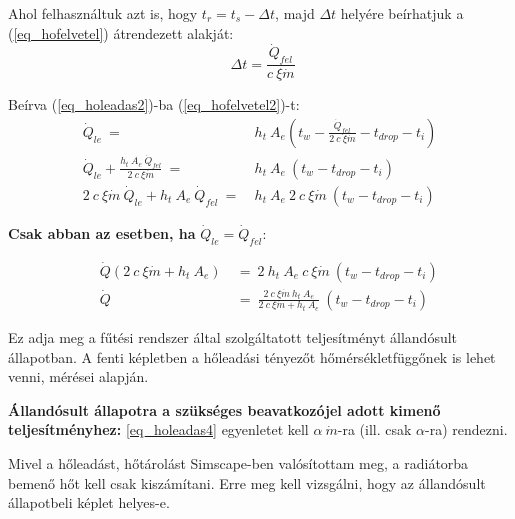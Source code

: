 Ahol felhasználtuk azt is, hogy $t_r = t_s-\Delta t$, majd $\Delta t$ helyére beírhatjuk a (\ref{eq_hofelvetel})  átrendezett alakját:
\begin{equation} \label{eq_hofelvetel2}
~~\Delta t = \frac{\dot Q_{fel}}{c ~ \xi\dot{m}}
\end{equation}

Beírva (\ref{eq_holeadas2})-ba (\ref{eq_hofelvetel2})-t:
\begin{equation} \label{holeadas3}
\begin{aligned}
\dot Q_{le} ~=~ & h_t~ A_e\left( t_w-\frac{\dot Q_{fel}}{2~c ~ \xi\dot{m}}-t_{drop}-t_i\right)  \\[18pt]
\dot Q_{le} + \frac{h_t ~ A_e ~ \dot Q_{fel}}{2 ~ c ~ \xi\dot{m}} ~ = ~ & h_t ~ A_e ~\left( t_w-t_{drop}-t_i\right) \\[24pt]
2 ~ c ~ \xi\dot{m} ~ \dot Q_{le} + h_t ~ A_e ~ \dot Q_{fel} ~ = ~ &  h_t ~ A_e ~ 2~ c~ \xi\dot{m} ~\left( t_w-t_{drop}-t_i\right)
\end{aligned}
\end{equation}

\textbf{Csak abban az esetben, ha} $\dot Q_{le}=\dot Q_{fel}$:



\begin{equation} \label{eq_holeadas4}
\begin{aligned}
~~~~~~\dot Q (2 ~ c ~ \xi\dot{m} + h_t ~ A_e) & ~=~ 2 ~ h_t ~ A_e ~ c~ \xi\dot{m} ~(t_w-t_{drop}-t_i) \\[18pt]
~~~~~~\dot Q &~=~ \frac{2~c~\xi\dot{m}~h_t~A_e}{2 ~c ~ \xi\dot{m} + h_t ~ A_e}~(t_w-t_{drop}-t_i)
\end{aligned}
\end{equation}

Ez adja meg a fűtési rendszer által szolgáltatott teljesítményt állandósult állapotban.
A fenti képletben a hőleadási tényezőt hőmérsékletfüggőnek is lehet venni, \cite{CHOLEWA2013599} mérései alapján.

\textbf{Állandósult állapotra a szükséges beavatkozójel adott kimenő teljesítményhez:} \ref{eq_holeadas4} egyenletet kell $\alpha~\dot{m}$-ra (ill. csak $\alpha$-ra) rendezni.

Mivel a hőleadást, hőtárolást Simscape-ben valósítottam meg, a radiátorba bemenő hőt kell csak kiszámítani. Erre meg kell vizsgálni, hogy az állandósult állapotbeli képlet helyes-e.

